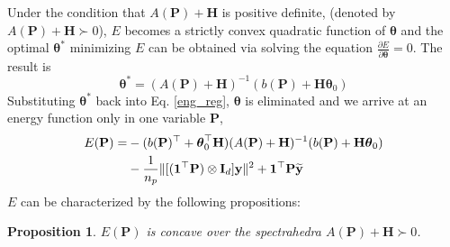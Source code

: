 \documentclass[11pt,bezier,]{article}
\newtheorem{proposition}{Proposition}
\begin{document}
  
Under the condition that $A(\mathbf P)+\mathbf H$ is positive definite,
(denoted by $A(\mathbf P)+\mathbf H\succ 0$),
$E$ becomes a strictly convex quadratic function of $\boldsymbol\theta$
and the optimal $\boldsymbol\theta^*$ minimizing $E$ 
can be obtained via solving  the equation $\frac{\partial E}{\partial \boldsymbol\theta}=0$.
The result is
\[
 \boldsymbol \theta^*=(A(\mathbf P)+\mathbf H)^{-1} (b(\mathbf P)+\mathbf H\boldsymbol\theta_0)
\]
Substituting $\boldsymbol \theta^*$ back into Eq. \eqref{eng_reg},
$\boldsymbol\theta$ is eliminated and we arrive at an energy function only in one variable $\mathbf P$,
\begin{align}
 E(\mathbf P)
= & -(b(\mathbf P)^\top + \boldsymbol\theta_0^\top\mathbf H)(A(\mathbf P)+\mathbf H)^{-1}  (b(\mathbf P) + \mathbf H\boldsymbol\theta_0)  \notag\\
 & -\frac{1}{n_p}
\| [({\mathbf 1}^\top\mathbf P) \otimes \mathbf I_d]\mathbf y \|^2
+ {\mathbf 1}^\top\mathbf P \mathbf{\widetilde y} 
\end{align}
$E$ can be characterized by the following propositions:
\begin{proposition} \label{prop:conv_reg} 
 $E(\mathbf P)$ is concave over the spectrahedra
 $A(\mathbf P)+\mathbf H\succ0$.
 \end{proposition}
\end{document}
